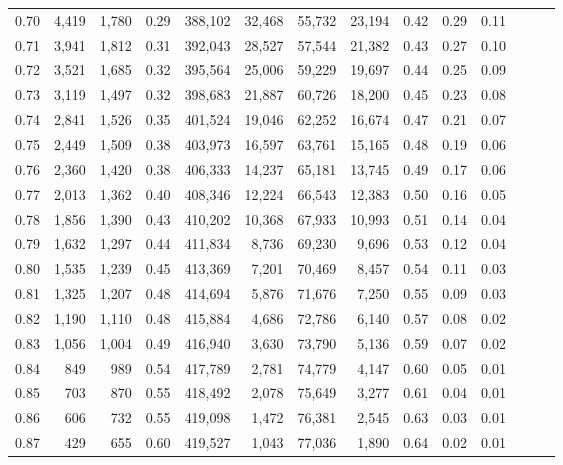 \begin{tabular}{rrrrrrrrrrrrrr}
0.70 &   4,419 &  1,780 &  0.29 &  388,102 &   32,468 &  55,732 &  23,194 &  0.42 &  0.29 &      0.11 \\
0.71 &   3,941 &  1,812 &  0.31 &  392,043 &   28,527 &  57,544 &  21,382 &  0.43 &  0.27 &      0.10 \\
0.72 &   3,521 &  1,685 &  0.32 &  395,564 &   25,006 &  59,229 &  19,697 &  0.44 &  0.25 &      0.09 \\
0.73 &   3,119 &  1,497 &  0.32 &  398,683 &   21,887 &  60,726 &  18,200 &  0.45 &  0.23 &      0.08 \\
0.74 &   2,841 &  1,526 &  0.35 &  401,524 &   19,046 &  62,252 &  16,674 &  0.47 &  0.21 &      0.07 \\
0.75 &   2,449 &  1,509 &  0.38 &  403,973 &   16,597 &  63,761 &  15,165 &  0.48 &  0.19 &      0.06 \\
0.76 &   2,360 &  1,420 &  0.38 &  406,333 &   14,237 &  65,181 &  13,745 &  0.49 &  0.17 &      0.06 \\
0.77 &   2,013 &  1,362 &  0.40 &  408,346 &   12,224 &  66,543 &  12,383 &  0.50 &  0.16 &      0.05 \\
0.78 &   1,856 &  1,390 &  0.43 &  410,202 &   10,368 &  67,933 &  10,993 &  0.51 &  0.14 &      0.04 \\
0.79 &   1,632 &  1,297 &  0.44 &  411,834 &    8,736 &  69,230 &   9,696 &  0.53 &  0.12 &      0.04 \\
0.80 &   1,535 &  1,239 &  0.45 &  413,369 &    7,201 &  70,469 &   8,457 &  0.54 &  0.11 &      0.03 \\
0.81 &   1,325 &  1,207 &  0.48 &  414,694 &    5,876 &  71,676 &   7,250 &  0.55 &  0.09 &      0.03 \\
0.82 &   1,190 &  1,110 &  0.48 &  415,884 &    4,686 &  72,786 &   6,140 &  0.57 &  0.08 &      0.02 \\
0.83 &   1,056 &  1,004 &  0.49 &  416,940 &    3,630 &  73,790 &   5,136 &  0.59 &  0.07 &      0.02 \\
0.84 &     849 &    989 &  0.54 &  417,789 &    2,781 &  74,779 &   4,147 &  0.60 &  0.05 &      0.01 \\
0.85 &     703 &    870 &  0.55 &  418,492 &    2,078 &  75,649 &   3,277 &  0.61 &  0.04 &      0.01 \\
0.86 &     606 &    732 &  0.55 &  419,098 &    1,472 &  76,381 &   2,545 &  0.63 &  0.03 &      0.01 \\
0.87 &     429 &    655 &  0.60 &  419,527 &    1,043 &  77,036 &   1,890 &  0.64 &  0.02 &      0.01 \\

\end{tabular}
